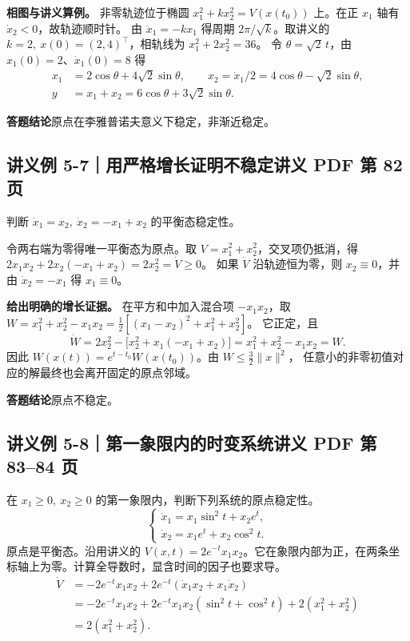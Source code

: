 \documentclass[UTF8,a4paper,11pt,fontset=fandol]{ctexart}
\begin{document}
\textbf{相图与讲义算例。}
非零轨迹位于椭圆 $x_1^2+kx_2^2=V(x(t_0))$ 上。在正 $x_1$ 轴有 $\dot x_2<0$，故轨迹顺时针。
由 $\ddot x_1=-kx_1$ 得周期 $2\pi/\sqrt{k}$。取讲义的 $k=2,\ x(0)=(2,4)^\top$，相轨线为 $x_1^2+2x_2^2=36$。
令 $\theta=\sqrt2\,t$，由 $x_1(0)=2$、$\dot x_1(0)=8$ 得
\[
\begin{aligned}
 x_1&=2\cos\theta+4\sqrt2\sin\theta,\qquad x_2=\dot x_1/2=4\cos\theta-\sqrt2\sin\theta,\\
 y&=x_1+x_2=6\cos\theta+3\sqrt2\sin\theta.
\end{aligned}
\]

\textbf{答题结论}\quad 原点在李雅普诺夫意义下稳定，非渐近稳定。

\subsection*{讲义例 5-7｜用严格增长证明不稳定\hfill{\normalfont\small 讲义 PDF 第 82 页}}
判断 $\dot x_1=x_2,\ \dot x_2=-x_1+x_2$ 的平衡态稳定性。

令两右端为零得唯一平衡态为原点。取 $V=x_1^2+x_2^2$，交叉项仍抵消，得
$2x_1x_2+2x_2(-x_1+x_2)=2x_2^2=\dot V\ge0$。
如果 $\dot V$ 沿轨迹恒为零，则 $x_2\equiv0$，并由 $\dot x_2=-x_1$ 得 $x_1\equiv0$。

\textbf{给出明确的增长证据。}
在平方和中加入混合项 $-x_1x_2$，取
$W=x_1^2+x_2^2-x_1x_2=\tfrac12[(x_1-x_2)^2+x_1^2+x_2^2]$。
它正定，且
\[
 \dot W=2x_2^2-\bigl[x_2^2+x_1(-x_1+x_2)\bigr]
       =x_1^2+x_2^2-x_1x_2=W.
\]
因此 $W(x(t))=e^{t-t_0}W(x(t_0))$。由 $W\le\tfrac32\lVert x\rVert^2$，
任意小的非零初值对应的解最终也会离开固定的原点邻域。

\textbf{答题结论}\quad 原点不稳定。

\newpage
\subsection*{讲义例 5-8｜第一象限内的时变系统\hfill{\normalfont\small 讲义 PDF 第 83--84 页}}
在 $x_1\ge0,\ x_2\ge0$ 的第一象限内，判断下列系统的原点稳定性。
\[
 \begin{cases}
 \dot x_1=x_1\sin^2 t+x_2e^t,\\
 \dot x_2=x_1e^t+x_2\cos^2 t .
 \end{cases}
\]
原点是平衡态。沿用讲义的 $V(x,t)=2e^{-t}x_1x_2$。它在象限内部为正，在两条坐标轴上为零。计算全导数时，显含时间的因子也要求导。
\[
\begin{aligned}
 \dot V
 &=-2e^{-t}x_1x_2+2e^{-t}(\dot x_1x_2+x_1\dot x_2)\\
 &=-2e^{-t}x_1x_2
   +2e^{-t}x_1x_2(\sin^2 t+\cos^2 t)+2(x_1^2+x_2^2)\\
 &=2(x_1^2+x_2^2).
\end{aligned}
\]
\end{document}
